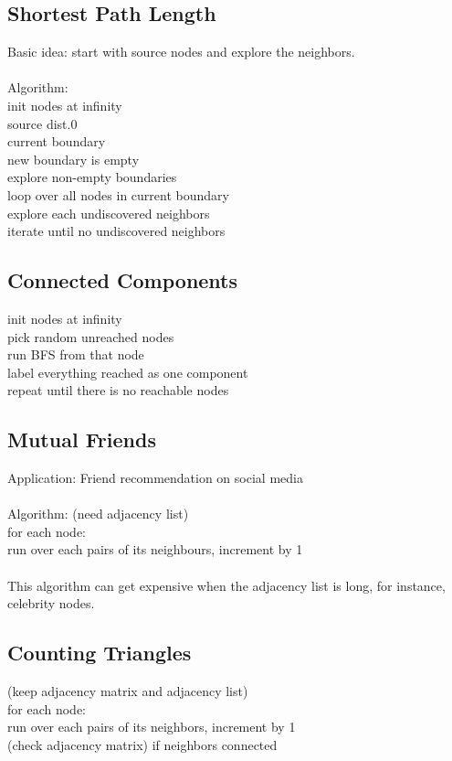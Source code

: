 \subsection{Shortest Path Length}
Basic idea: start with source nodes and explore the neighbors.\\
\\
Algorithm: \\
init nodes at infinity \\
\indent source dist.0 \\
\indent current boundary \\
\indent new boundary is empty \\
explore non-empty boundaries \\
loop over all nodes in current boundary \\
explore each undiscovered neighbors \\
iterate until no undiscovered neighbors

\subsection{Connected Components}
init nodes at infinity \\
pick random unreached nodes \\
run BFS from that node\\
\indent label everything reached as one component \\
repeat until there is no reachable nodes\\

\subsection{Mutual Friends}
Application: Friend recommendation on social media\\
\\
Algorithm: (need adjacency list) \\
for each node: \\
\indent run over each pairs of its neighbours, increment by 1 \\
\\
This algorithm can get expensive when the adjacency list is long, for instance, celebrity nodes.

\subsection{Counting Triangles}
(keep adjacency matrix and adjacency list) \\
for each node: \\
\indent run over each pairs of its neighbors, increment by 1 \\
\indent (check adjacency matrix) if neighbors connected

